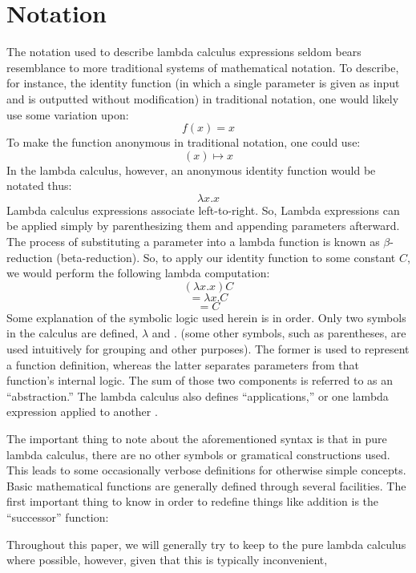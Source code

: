 \documentclass[twocolumn,titlepage]{article}
\begin{document}
\section{Notation}
The notation used to describe lambda calculus expressions seldom bears resemblance to more traditional systems of mathematical notation. To describe, for instance, the identity function (in which a single parameter is given as input and is outputted without modification) in traditional notation, one would likely use some variation upon:
$$f(x)=x$$
To make the function anonymous in traditional notation, one could use:
$$(x) \mapsto x$$
In the lambda calculus, however, an anonymous identity function would be notated thus:
$$\lambda x.x$$
Lambda calculus expressions associate left-to-right. So, Lambda expressions can be applied simply by parenthesizing them and appending parameters afterward. The process of substituting a parameter into a lambda function is known as $\beta$-reduction (beta-reduction). So, to apply our identity function to some constant $C$, we would perform the following lambda computation:
$$(\lambda x.x)C$$
$$=\lambda x.C$$
$$=C$$
Some explanation of the symbolic logic used herein is in order. Only two symbols in the calculus are defined, $\lambda$ and $.$ (some other symbols, such as parentheses, are used intuitively for grouping and other purposes). The former is used to represent a function definition, whereas the latter separates parameters from that function's internal logic. The sum of those two components is referred to as an ``abstraction.'' The lambda calculus also defines ``applications,'' or one lambda expression applied to another \cite{horowitz}.

The important thing to note about the aforementioned syntax is that in pure lambda calculus, there are no other symbols or gramatical constructions used. This leads to some occasionally verbose definitions for otherwise simple concepts. Basic mathematical functions are generally defined through several facilities. The first important thing to know in order to redefine things like addition is the ``successor'' function:
$$$$


Throughout this paper, we will generally try to keep to the pure lambda calculus where possible, however, given that this is typically inconvenient,
\end{document}
